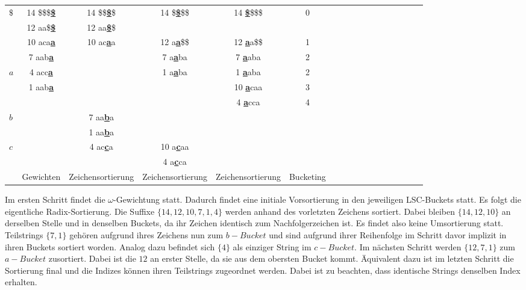 \begin{center}
  \begin{tabular}{ | l | c | c | c | c | c | c | c | c | c | c | c | c | c | c | c | c | }
    \hline
       $\$$ & 14 \$\$\$\textbf{\underline{\$}} & 14 \$\$\textbf{\underline{\$}}\$ & 14 \$\textbf{\underline{\$}}\$\$ & 14 \textbf{\underline{\$}}\$\$\$ & 0 \\
            & 12 aa\$\textbf{\underline{\$}} & 12 aa\textbf{\underline{\$}}\$ & & & \\ \hline
            & 10 aca\textbf{\underline{a}} & 10 ac\textbf{\underline{a}}a & 12 a\textbf{\underline{a}}\$\$ & 12 \textbf{\underline{a}}a\$\$ & 1 \\
            & 7 aab\textbf{\underline{a}} & & 7 a\textbf{\underline{a}}ba & 7 \textbf{\underline{a}}aba & 2 \\
        $a$ & 4 acc\textbf{\underline{a}} & & 1 a\textbf{\underline{a}}ba & 1 \textbf{\underline{a}}aba & 2  \\
            & 1 aab\textbf{\underline{a}} & & & 10 \textbf{\underline{a}}caa & 3 \\
            & & & & 4 \textbf{\underline{a}}cca & 4  \\ \hline
        $b$ & & 7 aa\textbf{\underline{b}}a & & & \\
            & & 1 aa\textbf{\underline{b}}a & & & \\ \hline
        $c$ & & 4 ac\textbf{\underline{c}}a & 10 a\textbf{\underline{c}}aa & & \\
            & & & 4 a\textbf{\underline{c}}ca & & \\ \hline
            & Gewichten & Zeichensortierung & Zeichensortierung & Zeichensortierung & Bucketing \\
    \hline
  \end{tabular}
\end{center}
\bigskip

\noindent Im ersten Schritt findet die $\omega$-Gewichtung statt. Dadurch findet eine initiale Vorsortierung in den jeweiligen LSC-Buckets statt. Es folgt die eigentliche Radix-Sortierung. Die Suffixe $\{14, 12, 10, 7, 1 , 4\}$ werden anhand des vorletzten Zeichens sortiert. Dabei bleiben $\{14, 12, 10\}$ an derselben Stelle und in denselben Buckets, da ihr Zeichen identisch zum Nachfolgerzeichen ist. Es findet also keine Umsortierung statt. Teilstrings $\{7, 1\}$ gehören aufgrund ihres Zeichens nun zum $b-Bucket$ und sind aufgrund ihrer Reihenfolge im Schritt davor implizit in ihren Buckets sortiert worden. Analog dazu befindet sich $\{4\}$ als einziger String im $c-Bucket$.
Im nächsten Schritt werden $\{12, 7, 1\}$ zum $a-Bucket$ zusortiert. Dabei ist die $12$ an erster Stelle, da sie aus dem obersten Bucket kommt. Äquivalent dazu ist im letzten Schritt die Sortierung final und die Indizes können ihren Teilstrings zugeordnet werden. Dabei ist zu beachten, dass identische Strings denselben Index erhalten.

